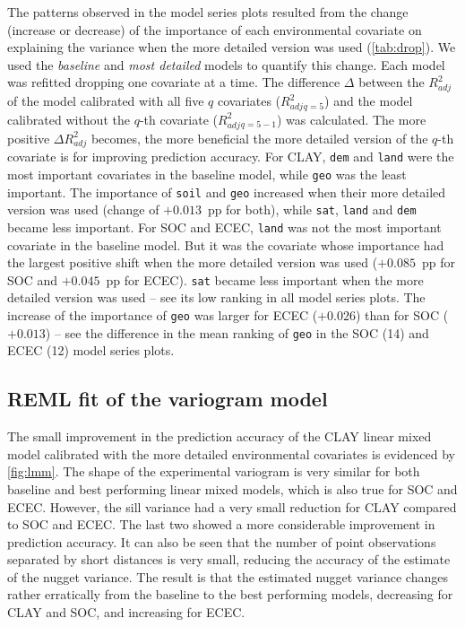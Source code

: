 The patterns observed in the model series plots resulted from the change (increase or decrease) of the 
importance of each environmental covariate on explaining the variance when the more detailed version was used 
(\autoref{tab:drop}). We used the \textit{baseline} and \textit{most detailed} models to quantify this change. 
Each model was refitted dropping one covariate at a time. The difference $\Delta$ between the ${R}^{2}_{adj}$ 
of the model calibrated with all five $q$ covariates (${R}^{2}_{adj}{}_{q=5}$) and the model calibrated without 
the $q$-th covariate ($R^{2}_{adj}{}_{q=5-1}$) was calculated. The more positive $\Delta{R}^{2}_{adj}$ 
becomes, the more beneficial the more detailed version of the $q$-th covariate is for improving prediction 
accuracy. For CLAY, \texttt{dem} and \texttt{land} were the most important covariates in the baseline model, 
while \texttt{geo} was the least important. The importance of \texttt{soil} and \texttt{geo} increased when 
their more detailed version was used (change of $+0.013$~pp for both), while \texttt{sat}, \texttt{land} 
and \texttt{dem} became less important. For SOC and ECEC, \texttt{land} was not the most important covariate in 
the baseline model. But it was the covariate whose importance had the largest positive shift when the more 
detailed version was used ($+0.085$~pp for SOC and $+0.045$~pp for ECEC). \texttt{sat} became less important 
when the more detailed version was used -- see its low ranking in all model series plots. The increase of the 
importance of \texttt{geo} was larger for ECEC ($+0.026$) than for SOC ($+0.013$) -- see the difference in the 
mean ranking of \texttt{geo} in the SOC (14) and ECEC (12) model series plots.



\subsection{REML fit of the variogram model}

The small improvement in the prediction accuracy of the CLAY linear mixed model calibrated with the more 
detailed environmental covariates is evidenced by \autoref{fig:lmm}. The shape of the experimental variogram is 
very similar for both baseline and best performing linear mixed models, which is also true for SOC and ECEC. 
However, the sill variance had a very small reduction for CLAY compared to SOC and ECEC. The last two showed a 
more considerable improvement in prediction accuracy. It can also be seen that the number of point observations 
separated by short distances is very small, reducing the accuracy of the estimate of the nugget variance. The 
result is that the estimated nugget variance changes rather erratically from the baseline to the best 
performing models, decreasing for CLAY and SOC, and increasing for ECEC.

